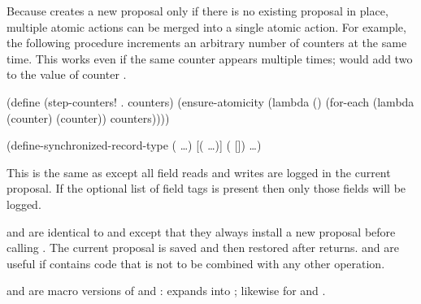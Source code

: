 Because  creates a new proposal only if there is
 no existing proposal in place, multiple atomic actions can be merged
 into a single atomic action.
For example, the following procedure increments an arbitrary number of
 counters at the same time.
This works even if the same counter appears multiple times;
  would add two to the value of counter .
\begin{example}
(define (step-counters! . counters)
  (ensure-atomicity
    (lambda ()
      (for-each (lambda (counter)
                  (counter))
                counters))))
\end{example}

\begin{example}
(define-synchronized-record-type  
  (  \ldots)
  [(\cvar {} \ldots)]
  (  [])
  \ldots)
\end{example}
This is the same as 
 except all field reads and
 writes are logged in the current proposal.
If the optional list of field tags is present then only those fields will
 be logged.

\begin{protos}
\end{protos}
\noindent
{} and  are identical
 to  and  except that they
 always install a new proposal before calling .
The current proposal is saved and then restored after  returns.
 and  are useful if  contains
 code that is not to be combined with any other operation.

 and  are macro versions of
 and :
 expands into
; likewise for
 and .


\begin{protos}
\end{protos}

